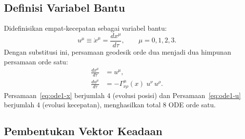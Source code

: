 \subsection{Definisi Variabel Bantu}
\label{subsec:variabel-bantu}

Didefinisikan empat-kecepatan sebagai variabel bantu:
\begin{equation}
    u^\mu \equiv \dot{x}^\mu = \frac{dx^\mu}{d\tau},
    \qquad \mu = 0, 1, 2, 3.
    \label{eq:u-def}
\end{equation}
Dengan substitusi ini, persamaan geodesik orde dua menjadi
dua himpunan persamaan orde satu:
\begin{align}
    \frac{dx^\mu}{d\tau} &= u^\mu,
    \label{eq:ode1-x} \\[6pt]
    \frac{du^\mu}{d\tau} &= -\Gamma^\mu_{\nu\rho}(x)\; u^\nu\, u^\rho.
    \label{eq:ode1-u}
\end{align}
Persamaan~\eqref{eq:ode1-x} berjumlah 4 (evolusi posisi)
dan Persamaan~\eqref{eq:ode1-u} berjumlah 4 (evolusi kecepatan),
menghasilkan total 8 ODE orde satu.


\subsection{Pembentukan Vektor Keadaan}
\label{subsec:state-vector}

